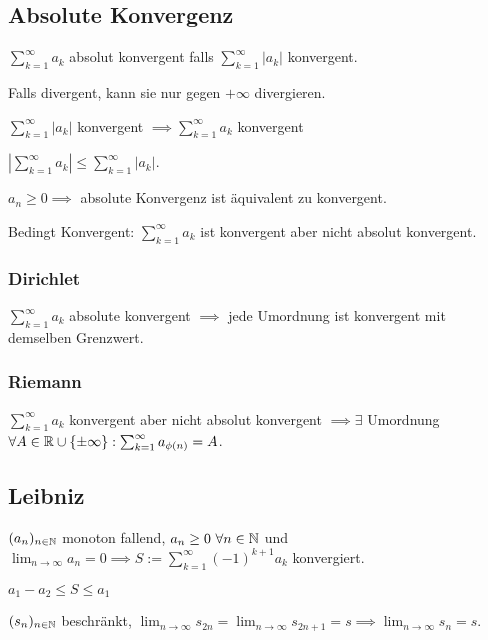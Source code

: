 \subsection{Absolute Konvergenz}
$\sum_{k=1}^{\infty} a_k$ absolut konvergent falls $\sum_{k=1}^{\infty} |a_k|$ konvergent.
\begin{compactitem}
    \item Falls divergent, kann sie nur gegen $+\infty$ divergieren.
    \item $\sum_{k=1}^{\infty}| a_k|$ konvergent $\implies \sum_{k=1}^{\infty} a_k$ konvergent
        \begin{compactitem}
            \item $\left| \sum_{k=1}^{\infty} a_k \right| \le \sum_{k=1}^{\infty} \left| a_k \right|$.
        \end{compactitem}
    \item $a_n \ge 0 \implies$ absolute Konvergenz ist äquivalent zu konvergent.
\end{compactitem}
\begin{compactdesc}
    \item[Bedingt Konvergent:] $\sum_{k=1}^{\infty} a_k$ ist konvergent aber nicht absolut konvergent.
\end{compactdesc}

\subsubsection{Dirichlet}
$\sum_{k=1}^{\infty} a_k$ absolute konvergent $\implies$ jede Umordnung ist konvergent mit demselben Grenzwert.

\subsubsection{Riemann}
$\sum_{k=1}^{\infty} a_k$ konvergent aber nicht absolut konvergent $\implies \exists $ Umordnung $\forall A \in \mathbb{R} \cup \{\pm \infty\}: \sum_{k=1}^{\infty} a_{\phi(n)} = A $.

\subsection{Leibniz}
$(a_n)_{n \in \mathbb{N}}$ monoton fallend, $a_n \ge 0 \ \forall n \in \mathbb{N}$ und $\lim_{n \to \infty} a_n = 0 \implies S:= \sum_{k=1}^{\infty} \left( -1 \right)^{k+1} a_k$ konvergiert.
\begin{compactitem}
    \item $a_1 - a_2 \le S \le a_1$
    \item $(s_n)_{n \in \mathbb{N}}$ beschränkt, $\lim_{n \to \infty} s_{2n} = \lim_{n \to \infty} s_{2n + 1} = s \implies \lim_{n \to \infty} s_n = s$.
\end{compactitem}

